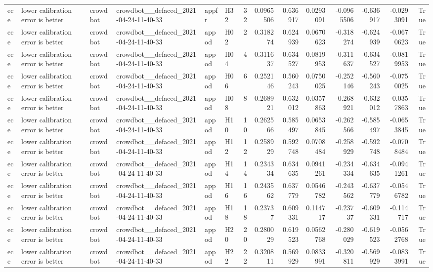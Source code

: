 \begin{longtable}{llllllrrrrrrrr}
ece & lower calibration error is better & crowdbot & crowdbot\_\_defaced\_2021-04-24-11-40-33 & appfr & H32 & 32 & 0.0965506 & 0.636917 & 0.0293091 & -0.0965506 & -0.636917 & -0.0293091 & True \\
ece & lower calibration error is better & crowdbot & crowdbot\_\_defaced\_2021-04-24-11-40-33 & appod & H02 & 2 & 0.318274 & 0.624939 & 0.0670623 & -0.318274 & -0.624939 & -0.0670623 & True \\
ece & lower calibration error is better & crowdbot & crowdbot\_\_defaced\_2021-04-24-11-40-33 & appod & H04 & 4 & 0.311637 & 0.634527 & 0.0819953 & -0.311637 & -0.634527 & -0.0819953 & True \\
ece & lower calibration error is better & crowdbot & crowdbot\_\_defaced\_2021-04-24-11-40-33 & appod & H06 & 6 & 0.252146 & 0.560243 & 0.0750025 & -0.252146 & -0.560243 & -0.0750025 & True \\
ece & lower calibration error is better & crowdbot & crowdbot\_\_defaced\_2021-04-24-11-40-33 & appod & H08 & 8 & 0.268921 & 0.632012 & 0.0357863 & -0.268921 & -0.632012 & -0.0357863 & True \\
ece & lower calibration error is better & crowdbot & crowdbot\_\_defaced\_2021-04-24-11-40-33 & appod & H10 & 10 & 0.262566 & 0.585497 & 0.0653845 & -0.262566 & -0.585497 & -0.0653845 & True \\
ece & lower calibration error is better & crowdbot & crowdbot\_\_defaced\_2021-04-24-11-40-33 & appod & H12 & 12 & 0.258929 & 0.592748 & 0.0708484 & -0.258929 & -0.592748 & -0.0708484 & True \\
ece & lower calibration error is better & crowdbot & crowdbot\_\_defaced\_2021-04-24-11-40-33 & appod & H14 & 14 & 0.234334 & 0.634635 & 0.0941261 & -0.234334 & -0.634635 & -0.0941261 & True \\
ece & lower calibration error is better & crowdbot & crowdbot\_\_defaced\_2021-04-24-11-40-33 & appod & H16 & 16 & 0.243562 & 0.637779 & 0.0546782 & -0.243562 & -0.637779 & -0.0546782 & True \\
ece & lower calibration error is better & crowdbot & crowdbot\_\_defaced\_2021-04-24-11-40-33 & appod & H18 & 18 & 0.23737 & 0.609331 & 0.114717 & -0.23737 & -0.609331 & -0.114717 & True \\
ece & lower calibration error is better & crowdbot & crowdbot\_\_defaced\_2021-04-24-11-40-33 & appod & H20 & 20 & 0.280029 & 0.619523 & 0.0562768 & -0.280029 & -0.619523 & -0.0562768 & True \\
ece & lower calibration error is better & crowdbot & crowdbot\_\_defaced\_2021-04-24-11-40-33 & appod & H22 & 22 & 0.320811 & 0.569929 & 0.0833991 & -0.320811 & -0.569929 & -0.0833991 & True \\

\end{longtable}
